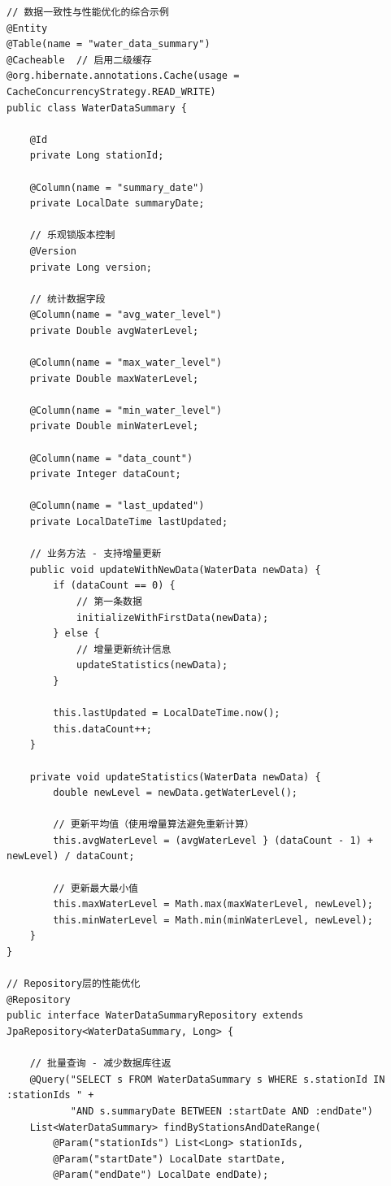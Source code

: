 \begin{lstlisting}[style=java]
// 数据一致性与性能优化的综合示例
@Entity
@Table(name = "water_data_summary")
@Cacheable  // 启用二级缓存
@org.hibernate.annotations.Cache(usage = CacheConcurrencyStrategy.READ_WRITE)
public class WaterDataSummary {
    
    @Id
    private Long stationId;
    
    @Column(name = "summary_date")
    private LocalDate summaryDate;
    
    // 乐观锁版本控制
    @Version
    private Long version;
    
    // 统计数据字段
    @Column(name = "avg_water_level")
    private Double avgWaterLevel;
    
    @Column(name = "max_water_level")
    private Double maxWaterLevel;
    
    @Column(name = "min_water_level") 
    private Double minWaterLevel;
    
    @Column(name = "data_count")
    private Integer dataCount;
    
    @Column(name = "last_updated")
    private LocalDateTime lastUpdated;
    
    // 业务方法 - 支持增量更新
    public void updateWithNewData(WaterData newData) {
        if (dataCount == 0) {
            // 第一条数据
            initializeWithFirstData(newData);
        } else {
            // 增量更新统计信息
            updateStatistics(newData);
        }
        
        this.lastUpdated = LocalDateTime.now();
        this.dataCount++;
    }
    
    private void updateStatistics(WaterData newData) {
        double newLevel = newData.getWaterLevel();
        
        // 更新平均值（使用增量算法避免重新计算）
        this.avgWaterLevel = (avgWaterLevel } (dataCount - 1) + newLevel) / dataCount;
        
        // 更新最大最小值
        this.maxWaterLevel = Math.max(maxWaterLevel, newLevel);
        this.minWaterLevel = Math.min(minWaterLevel, newLevel);
    }
}

// Repository层的性能优化
@Repository
public interface WaterDataSummaryRepository extends JpaRepository<WaterDataSummary, Long> {
    
    // 批量查询 - 减少数据库往返
    @Query("SELECT s FROM WaterDataSummary s WHERE s.stationId IN :stationIds " +
           "AND s.summaryDate BETWEEN :startDate AND :endDate")
    List<WaterDataSummary> findByStationsAndDateRange(
        @Param("stationIds") List<Long> stationIds,
        @Param("startDate") LocalDate startDate,
        @Param("endDate") LocalDate endDate);
    

\end{lstlisting}

